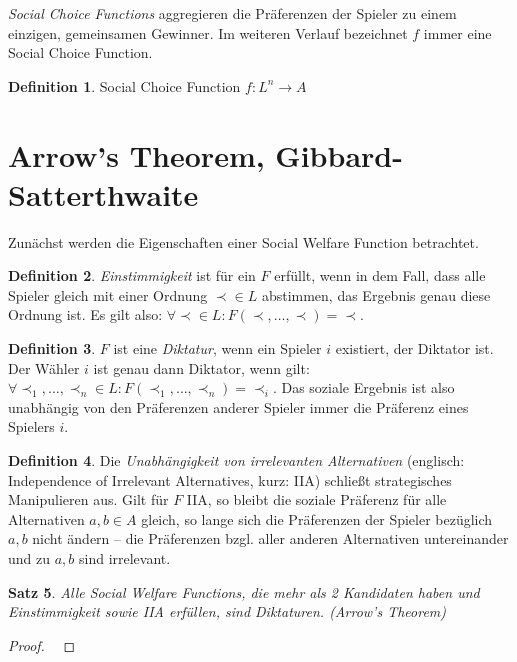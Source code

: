 \documentclass[a4paper,11pt]{article}
\theoremstyle{definition}
\newtheorem{definition}{Definition}
\theoremstyle{plain}
\newtheorem{theorem}[definition]{Satz}
\theoremstyle{definition}
\begin{document}
\emph{Social Choice Functions} aggregieren die Präferenzen der Spieler zu einem einzigen, gemeinsamen Gewinner. Im weiteren Verlauf bezeichnet $f$ immer eine Social Choice Function.
\begin{definition}
	\label{def:socialchoicefunc}
	Social Choice Function $f : L^n \rightarrow A$
\end{definition}

\section{Arrow's Theorem, Gibbard-Satterthwaite}
Zunächst werden die Eigenschaften einer Social Welfare Function betrachtet.

\begin{definition}
	\label{def:einstimmigkeit}
	\emph{Einstimmigkeit} ist für ein $F$ erfüllt, wenn in dem Fall, dass alle Spieler gleich mit einer Ordnung $\prec \in L$ abstimmen, das Ergebnis genau diese Ordnung ist. Es gilt also: $\forall \prec \in L: F(\prec, \ldots,\prec) = \prec$.
\end{definition}

\begin{definition}
	\label{def:diktatur}
	$F$ ist eine \emph{Diktatur}, wenn ein Spieler $i$ existiert, der Diktator ist. Der Wähler $i$ ist genau dann Diktator, wenn gilt: $\forall \prec_1, \ldots, \prec_n \in L: F(\prec_1, \ldots, \prec_n) = \prec_i$. Das soziale Ergebnis ist also unabhängig von den Präferenzen anderer Spieler immer die Präferenz eines Spielers $i$.
\end{definition}

\begin{definition}
	\label{def:IIA}
	Die \emph{Unabhängigkeit von irrelevanten Alternativen} (englisch: Independence of Irrelevant Alternatives, kurz: IIA) schließt strategisches Manipulieren aus. Gilt für $F$ IIA, so bleibt die soziale Präferenz für alle Alternativen $a, b \in A$ gleich, so lange sich die Präferenzen der Spieler bezüglich $a, b$ nicht ändern -- die  Präferenzen bzgl. aller anderen Alternativen untereinander und zu $a, b$ sind irrelevant.
\end{definition}

\begin{theorem}
	Alle Social Welfare Functions, die mehr als 2 Kandidaten haben und Einstimmigkeit sowie IIA erfüllen, sind Diktaturen. (Arrow's Theorem)
\end{theorem}


\begin{proof}
	~\cite{fey14}
\end{proof}
\end{document}
